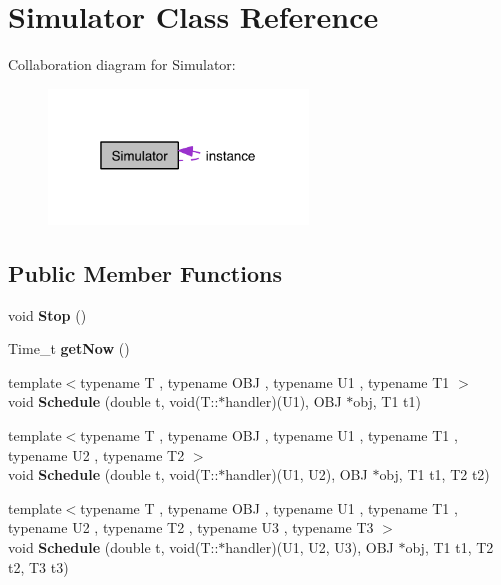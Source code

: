 \hypertarget{class_simulator}{\section{Simulator Class Reference}
\label{class_simulator}
}


Collaboration diagram for Simulator\-:\nopagebreak
\begin{figure}[H]
\begin{center}
\leavevmode
\includegraphics[width=196pt]{class_simulator__coll__graph}
\end{center}
\end{figure}
\subsection*{Public Member Functions}
\begin{DoxyCompactItemize}
\item 
\hypertarget{class_simulator_ad493423e80256f53c715bb59c16ec78e}{void {\bfseries Stop} ()}\label{class_simulator_ad493423e80256f53c715bb59c16ec78e}

\item 
\hypertarget{class_simulator_a7fe5c584b3fc3f93f5b13e882ca27009}{Time\-\_\-t {\bfseries get\-Now} ()}\label{class_simulator_a7fe5c584b3fc3f93f5b13e882ca27009}

\item 
\hypertarget{class_simulator_a0d67931f9d55c1f284f6467b9015c1c4}{{\footnotesize template$<$typename T , typename O\-B\-J , typename U1 , typename T1 $>$ }\\void {\bfseries Schedule} (double t, void(T\-::$\ast$handler)(U1), O\-B\-J $\ast$obj, T1 t1)}\label{class_simulator_a0d67931f9d55c1f284f6467b9015c1c4}

\item 
\hypertarget{class_simulator_a5dc207907f17173964ca9a04d7d4b8fe}{{\footnotesize template$<$typename T , typename O\-B\-J , typename U1 , typename T1 , typename U2 , typename T2 $>$ }\\void {\bfseries Schedule} (double t, void(T\-::$\ast$handler)(U1, U2), O\-B\-J $\ast$obj, T1 t1, T2 t2)}\label{class_simulator_a5dc207907f17173964ca9a04d7d4b8fe}

\item 
\hypertarget{class_simulator_a2a00f7c57e142e06046f4df091f0173b}{{\footnotesize template$<$typename T , typename O\-B\-J , typename U1 , typename T1 , typename U2 , typename T2 , typename U3 , typename T3 $>$ }\\void {\bfseries Schedule} (double t, void(T\-::$\ast$handler)(U1, U2, U3), O\-B\-J $\ast$obj, T1 t1, T2 t2, T3 t3)}\label{class_simulator_a2a00f7c57e142e06046f4df091f0173b}

\end{DoxyCompactItemize}
